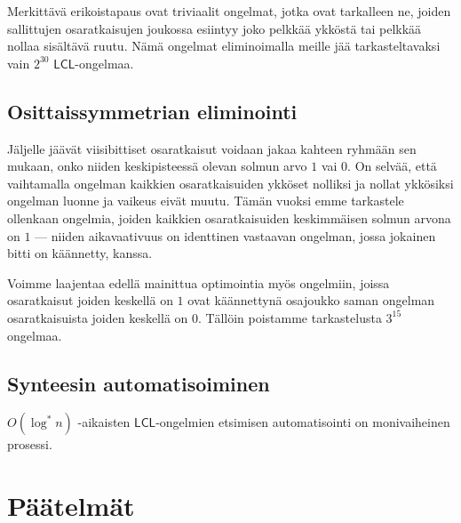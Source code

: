 \documentclass[12pt,finnish]{tktltiki2}
\theoremstyle{definition}
\theoremstyle{remark}
\newcommand*{\lcl}{\ensuremath{\mathsf{LCL}}}
\begin{document}
Merkittävä erikoistapaus ovat triviaalit ongelmat, jotka ovat tarkalleen ne, joiden sallittujen osaratkaisujen joukossa esiintyy joko pelkkää ykköstä tai pelkkää nollaa sisältävä ruutu. Nämä ongelmat eliminoimalla meille jää tarkasteltavaksi vain $2^{30}$ \lcl -ongelmaa.

\subsection{Osittaissymmetrian eliminointi}
Jäljelle jäävät viisibittiset osaratkaisut voidaan jakaa kahteen ryhmään sen mukaan, onko niiden keskipisteessä olevan solmun arvo $1$ vai $0$. On selvää, että vaihtamalla ongelman kaikkien osaratkaisuiden ykköset nolliksi ja nollat ykkösiksi ongelman luonne ja vaikeus eivät muutu. Tämän vuoksi emme tarkastele ollenkaan ongelmia, joiden kaikkien osaratkaisuiden keskimmäisen solmun arvona on $1$ --- niiden aikavaativuus on identtinen vastaavan ongelman, jossa jokainen bitti on käännetty, kanssa.

Voimme laajentaa edellä mainittua optimointia myös ongelmiin, joissa osaratkaisut joiden keskellä on $1$ ovat käännettynä osajoukko saman ongelman osaratkaisuista joiden keskellä on $0$. Tällöin poistamme tarkastelusta $3^{15}$ ongelmaa.

\subsection{Synteesin automatisoiminen}
$O(\log^* n)$ -aikaisten \lcl -ongelmien etsimisen automatisointi on monivaiheinen prosessi.



\section{Päätelmät}






%
%
% 
%







% 
\end{document}
